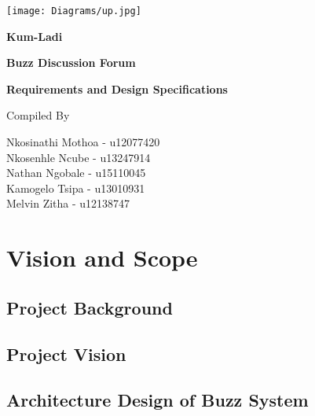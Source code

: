 \documentclass[12pt]{article}
\begin{document}
\begin{titlepage}
\begin{center}
\texttt{[image: Diagrams/up.jpg]}
\bigskip
\bigskip
\bigskip
\begin{huge}
\textbf{Kum-Ladi}
	
\bigskip
\bigskip
\bigskip
\textbf{Buzz Discussion Forum}
\bigskip
\bigskip
\bigskip
\end{huge}

 \begin{huge}
 \textbf{Requirements and Design Specifications}
\end{huge}

\bigskip
\bigskip
\bigskip

Compiled By \\[\baselineskip]
{\large

Nkosinathi Mothoa - u12077420\\
Nkosenhle Ncube - u13247914\\
Nathan Ngobale - u15110045\\
Kamogelo Tsipa - u13010931\\
Melvin Zitha - u12138747\\ 
\par}

\end{center}

\end{titlepage}

\newpage
\tableofcontents

\newpage
\section{Vision and Scope}
\subsection{Project Background}
\paragraph{}     

\subsection{Project Vision} 
\paragraph{}

\subsection{Architecture Design of Buzz System}
\end{document}
